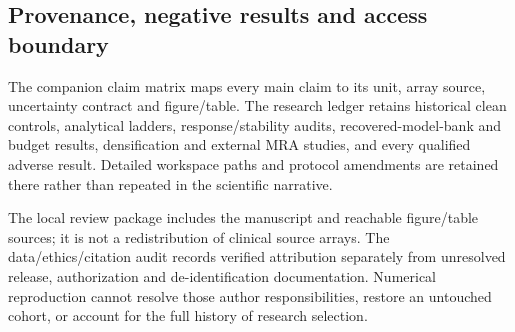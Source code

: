 \subsection{Provenance, negative results and access boundary}
The companion claim matrix maps every main claim to its unit, array source, uncertainty contract and figure/table. The research ledger retains historical clean controls, analytical ladders, response/stability audits, recovered-model-bank and budget results, densification and external MRA studies, and every qualified adverse result. Detailed workspace paths and protocol amendments are retained there rather than repeated in the scientific narrative.

The local review package includes the manuscript and reachable figure/table sources; it is not a redistribution of clinical source arrays. The data/ethics/citation audit records verified attribution separately from unresolved release, authorization and de-identification documentation. Numerical reproduction cannot resolve those author responsibilities, restore an untouched cohort, or account for the full history of research selection.
